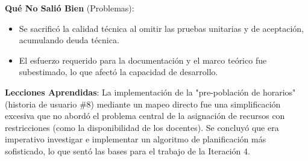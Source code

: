 \textbf{Qué No Salió Bien} (Problemas):
\begin{itemize}
    \item Se sacrificó la calidad técnica al omitir las pruebas unitarias y de aceptación, acumulando deuda técnica.
    \item El esfuerzo requerido para la documentación y el marco teórico fue subestimado, lo que afectó la capacidad de desarrollo.
\end{itemize}

\textbf{Lecciones Aprendidas}:
La implementación de la "pre-población de horarios" (historia de usuario \#8) mediante un mapeo directo fue una simplificación excesiva que no abordó el problema central de la asignación de recursos con restricciones (como la disponibilidad de los docentes). Se concluyó que era imperativo investigar e implementar un algoritmo de planificación más sofisticado, lo que sentó las bases para el trabajo de la Iteración 4.
